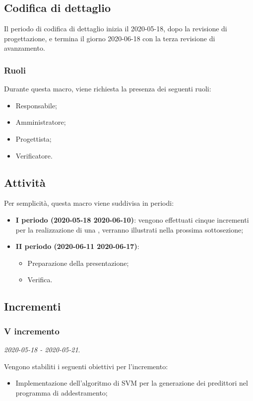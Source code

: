 \documentclass[../piano-di-progetto.tex]{subfiles}
\begin{document}
\subsection{Codifica di dettaglio}
Il periodo di codifica di dettaglio inizia il 2020-05-18, dopo la revisione di progettazione, e termina il giorno 2020-06-18 con la terza revisione di avanzamento.
\subsubsection{Ruoli}
Durante questa macro, viene richiesta la presenza dei seguenti ruoli:
\begin{itemize}
    \item Responsabile;
    \item Amministratore;
    \item Progettista;
    \item Verificatore.
\end{itemize}

\subsection{Attività}
Per semplicità, questa macro viene suddivisa in periodi:

\begin{itemize}
    \item \textbf{I periodo (2020-05-18 2020-06-10)}: vengono effettuati cinque incrementi per la realizzazione di una , verranno illustrati nella prossima sottosezione;
    \item \textbf{II periodo (2020-06-11 2020-06-17)}:
        \begin{itemize}
            \item Preparazione della presentazione;
            \item Verifica.
        \end{itemize}
\end{itemize}
\subsection{Incrementi}

\subsubsection{V incremento}
\emph{2020-05-18 - 2020-05-21}. 
 
 Vengono stabiliti i seguenti obiettivi per l'incremento:
 \begin{itemize}
     \item Implementazione dell'algoritmo di SVM per la generazione dei predittori nel programma di addestramento;
 \end{itemize}
\end{document}

